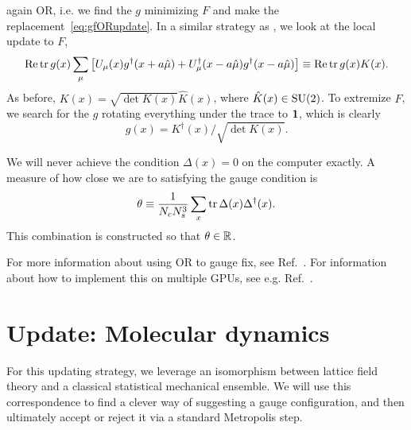again OR, i.e. we find the $g$ minimizing $F$ and make the
replacement~\eqref{eq:gfORupdate}. In a similar strategy as
, we look at the local update to $F$,
\begin{equation}
  \mathop{\mathrm{Re}}\tr g(x)\sum_\mu\left[U_\mu(x)g^\dagger(x+a\hat\mu)
                        +U_\mu^\dagger(x-a\hat\mu)g^\dagger(x-a\hat\mu)\right]
  \equiv\mathop{\mathrm{Re}}\tr g(x)K(x).
\end{equation}
As before, $K(x)=\sqrt{\det K(x)}\hat K(x)$, where $\hat K(x)\in\operatorname{SU}(2)$.
To extremize $F$, we search for the $g$ rotating everything under the
trace to ${\mathbf 1}$, which is clearly
\begin{equation}
  g(x)=K^\dagger(x)/\sqrt{\det K(x)}.
\end{equation} 

We will never achieve the condition $\Delta(x)=0$ on the computer exactly.
A measure of how close we are to satisfying the gauge condition is
\begin{equation}
  \theta\equiv\frac{1}{N_c N_s^3}\sum_x\tr\Delta(x)\Delta^\dagger(x).
\end{equation}
This combination is constructed so that $\theta\in\mathbb{R}$. 

For more information
about using OR to gauge fix, see Ref.~\cite{mandula_efficient_1990}. 
For information about how to implement this on multiple GPUs, see
e.g. Ref.~\cite{schrock_coulomb_2013}.

\section{Update: Molecular dynamics}\label{sec:MD}

For this updating strategy, we leverage an isomorphism between
lattice field theory and a classical statistical mechanical 
ensemble. We will use this
correspondence to find a clever way of suggesting a gauge
configuration, and then ultimately accept or reject it via
a standard Metropolis step.

